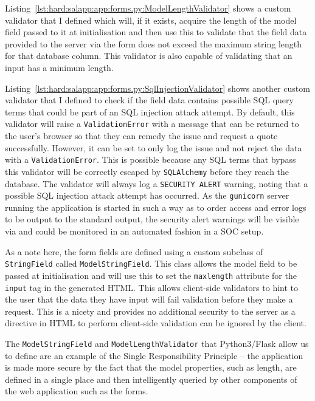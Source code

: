 Listing~\ref{lst:hard:salapp:app:forms.py:ModelLengthValidator} shows a custom validator that I defined which will, if it exists, acquire the length of the model field passed to it at initialisation and then use this to validate that the field data provided to the server via the form does not exceed the maximum string length for that database column. This validator is also capable of validating that an input has a minimum length.

Listing~\ref{lst:hard:salapp:app:forms.py:SqlInjectionValidator} shows another custom validator that I defined to check if the field data contains possible SQL query terms that could be part of an SQL injection attack attempt. By default, this validator will raise a \texttt{ValidationError} with a message that can be returned to the user's browser so that they can remedy the issue and request a quote successfully. However, it can be set to only log the issue and not reject the data with a \texttt{ValidationError}. This is possible because any SQL terms that bypass this validator will be correctly escaped by \texttt{SQLAlchemy} before they reach the database. The validator will always log a \texttt{SECURITY ALERT} warning, noting that a possible SQL injection attack attempt has occurred. As the \texttt{gunicorn} server running the application is started in such a way as to order access and error logs to be output to the standard output, the security alert warnings will be visible via  and could be monitored in an automated fashion in a SOC setup.

As a note here, the form fields are defined using a custom subclass of \texttt{StringField} called \texttt{ModelStringField}. This class allows the model field to be passed at initialisation and will use this to set the \texttt{maxlength} attribute for the \texttt{input} tag in the generated HTML. This allows client-side validators to hint to the user that the data they have input will fail validation before they make a request. This is a nicety and provides no additional security to the server as a directive in HTML to perform client-side validation can be ignored by the client.

The \texttt{ModelStringField} and \texttt{ModelLengthValidator} that Python3/Flask allow us to define are an example of the Single Responsibility Principle -- the application is made more secure by the fact that the model properties, such as length, are defined in a single place and then intelligently queried by other components of the web application such as the forms.

